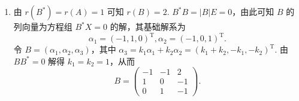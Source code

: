 \begin{exercise}
\begin{exgroup}
\begin{answer}
\begin{enumerate}
\begin{enumerate}
\begin{align*}
\begin{pmatrix}
                                             -D_{21}D_{11}^{-1} & E_{n-1}
                                         \end{pmatrix}
                                    \begin{pmatrix}
                                        D_{11}C_{11} & D_{11}C_{12}              \\
                                        D_{21}C_{11} & D_{21}C_{12}+D_{22}C_{22}
                                    \end{pmatrix} \\
                                     & = \begin{pmatrix}
                                             D_{11}C_{11} & D_{11}C_{12} \\
                                             O            & D_{22}C_{22}
                                         \end{pmatrix},
                                \end{align*}
                                故
                                \[C_{11}D_{11} = \dfrac{1}{\lvert PQ \rvert}\lvert DC \rvert = \dfrac{1}{\lvert PQ \rvert}D_{11}C_{11} \lvert D_{22}C_{22} \rvert,\]
                                从而
                                \[\dfrac{1}{\lvert PQ \rvert} \lvert D_{22}C_{22} \rvert = 1,\]
                                即
                                \[\lvert D_{22}C_{22} \rvert = \lvert PQ \rvert.\]
                                命题得证.

                          \item $r(B) = 0$ 则是平凡情况，其是所有 $r \leqslant n-2$ 矩阵的伴随矩阵.
                      \end{enumerate}

                \item 由 $r(B^*) = r(A) = 1$ 可知 $r(B) = 2$. $B^*B = \lvert B \rvert E = 0$，由此可知 $B$ 的列向量为方程组 $B^*X = 0$ 的解，其基础解系为
                      \[\alpha_1 = (-1, 1, 0)^{\mathrm{T}}, \alpha_2 = (-1, 0, 1)^{\mathrm{T}}.\]
                      令 $B = (\alpha_1, \alpha_2, \alpha_3)$，其中 $\alpha_3 = k_1\alpha_1+k_2\alpha_2 = (k_1+k_2, -k_1, -k_2)^{\mathrm{T}}$. 由 $BB^* = 0$ 解得 $k_1 = k_2 = 1$，从而
                      \[B = \begin{pmatrix}
                              -1 & -1 & 2  \\
                              1  & 0  & -1 \\
                              0  & 1  & -1
                          \end{pmatrix}.\]
            \end{enumerate}
        \end{answer}


\end{exgroup}
\end{exercise}
